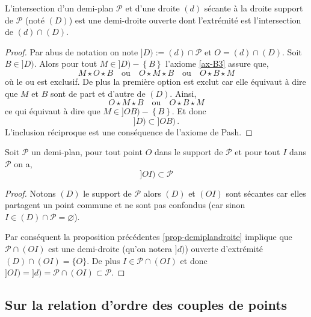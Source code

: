 \begin{prop}\label{prop-demiplandroite}
    L'intersection d'un demi-plan $\mathcal{P}$ et d'une droite $(d)$ sécante à la droite support de $\mathcal{P}$ (noté $(D)$) est une demi-droite ouverte dont l'extrémité est l'intersection de $(d)\cap(D)$.
\begin{proof}
    Par abus de notation on note $]D) := (d) \cap \mathcal{P}$ et $O = (d)\cap(D)$. Soit $B\in ]D)$. Alors pour tout $M \in ]D)-\left\{B\right\}$ l'axiome \ref{ax-B3} assure que,
    \begin{equation*}
        M \star O \star B \quad \text{ou}\quad O \star M \star B \quad \text{ou}\quad O \star B \star M
    \end{equation*}
    où le ou est exclusif. De plus la première option est exclut car elle équivaut à dire que $M$ et $B$ sont de part et d'autre de $(D)$. Ainsi,
    \begin{equation*}
        O \star M \star B \quad \text{ou}\quad O \star B \star M
    \end{equation*}
    ce qui équivaut à dire que $M\in ]OB)-\left\{B\right\}$. Et donc $$]D)\subset ]OB)\,.$$ L'inclusion réciproque est une conséquence de l'axiome de Pash. 
\end{proof}
\end{prop}
\begin{prop}\label{prop-demidroitedemiplan}
    Soit $\mathcal{P}$ un demi-plan, pour tout point $O$ dans le support de $\mathcal{P}$ et pour tout $I$ dans $\mathcal{P}$ on a,
    \begin{equation*}
        ]OI)\subset\mathcal{P}
    \end{equation*}
\begin{proof}
    Notons $(D)$ le support de $\mathcal{P}$ alors $(D)$ et $(OI)$ sont sécantes car elles partagent un point commune et ne sont pas confondus (car sinon $I\in(D)\cap\mathcal{P}=\varnothing$). 

    Par conséquent la proposition précédentes \ref{prop-demiplandroite} implique que $\mathcal{P}\cap (OI)$ est une demi-droite (qu'on notera $]d)$) ouverte d'extrémité $(D)\cap (OI)=\{O\}$. De plus $I\in \mathcal{P}\cap (OI)$ et donc $]OI)=]d)=\mathcal{P}\cap (OI)\subset \mathcal{P}$.
\end{proof}
\end{prop}

        \subsection{Sur la relation d'ordre des couples de points}\label{subsec-ordresegment}

